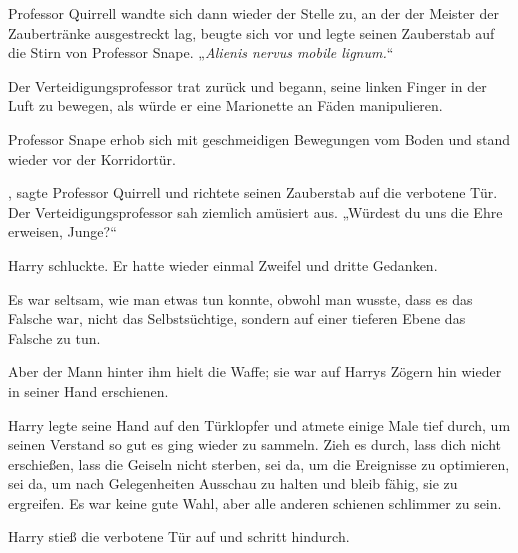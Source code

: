 Professor Quirrell wandte sich dann wieder der Stelle zu, an der der Meister der Zaubertränke ausgestreckt lag, beugte sich vor und legte seinen Zauberstab auf die Stirn von Professor Snape. „\emph{Alienis nervus mobile lignum.}“

Der Verteidigungsprofessor trat zurück und begann, seine linken Finger in der Luft zu bewegen, als würde er eine Marionette an Fäden manipulieren.

Professor Snape erhob sich mit geschmeidigen Bewegungen vom Boden und stand wieder vor der Korridortür.

, sagte Professor Quirrell und richtete seinen Zauberstab auf die verbotene Tür.
Der Verteidigungsprofessor sah ziemlich amüsiert aus.
„Würdest du uns die Ehre erweisen, Junge?“

Harry schluckte. Er hatte wieder einmal Zweifel und dritte Gedanken.

Es war seltsam, wie man etwas tun konnte, obwohl man wusste, dass es das Falsche war, nicht das Selbstsüchtige, sondern auf einer tieferen Ebene das Falsche zu tun.

Aber der Mann hinter ihm hielt die Waffe; sie war auf Harrys Zögern hin wieder in seiner Hand erschienen.

Harry legte seine Hand auf den Türklopfer und atmete einige Male tief durch, um seinen Verstand so gut es ging wieder zu sammeln.
Zieh es durch, lass dich nicht erschießen, lass die Geiseln nicht sterben, sei da, um die Ereignisse zu optimieren, sei da, um nach Gelegenheiten Ausschau zu halten und bleib fähig, sie zu ergreifen.
Es war keine gute Wahl, aber alle anderen schienen schlimmer zu sein.

Harry stieß die verbotene Tür auf und schritt hindurch.

